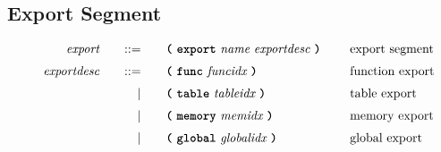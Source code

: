 \subsection{Export Segment}

\begin{alignat*}{9}
    && \textit{export}    &&\quad ::= &\quad && \textbf{\texttt{(}}\ \textbf{\texttt{export}}\ \textit{name}\ \textit{exportdesc}\ \textbf{\texttt{)}}\ \quad && \textrm{export segment} \\[1mm]
    && \textit{exportdesc}    &&\quad ::= &\quad && \textbf{\texttt{(}}\ \textbf{\texttt{func}}\   \textit{funcidx}\  \textbf{\texttt{)}}\ \quad && \textrm{function export} \\[1mm]
    &&                        &&\quad  |  &\quad && \textbf{\texttt{(}}\ \textbf{\texttt{table}}\  \textit{tableidx}\  \textbf{\texttt{)}}\ \quad && \textrm{table export} \\[1mm]
    &&                        &&\quad  |  &\quad && \textbf{\texttt{(}}\ \textbf{\texttt{memory}}\ \textit{memidx}\  \textbf{\texttt{)}}\ \quad && \textrm{memory export} \\[1mm]
    &&                        &&\quad  |  &\quad && \textbf{\texttt{(}}\ \textbf{\texttt{global}}\ \textit{globalidx}\  \textbf{\texttt{)}}\ \quad && \textrm{global export} \\[1mm]
\end{alignat*}